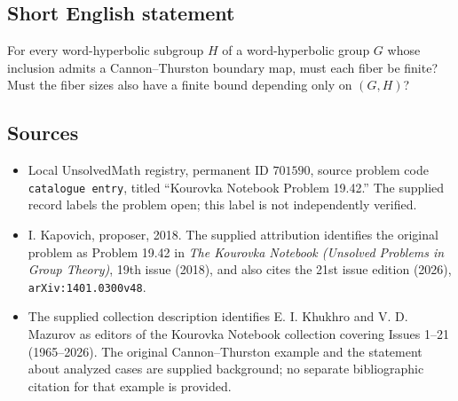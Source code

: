 \documentclass[11pt]{article}
\begin{document}
\subsection{Short English statement}
For every word-hyperbolic subgroup \(H\) of a word-hyperbolic group \(G\) whose inclusion admits a Cannon--Thurston boundary map, must each fiber be finite? Must the fiber sizes also have a finite bound depending only on \((G,H)\)?
\subsection{Sources}
\begin{itemize}
\item Local UnsolvedMath registry, permanent ID \(701590\), source problem code \texttt{catalogue entry}, titled ``Kourovka Notebook Problem 19.42.'' The supplied record labels the problem open; this label is not independently verified.
\item I. Kapovich, proposer, 2018. The supplied attribution identifies the original problem as Problem 19.42 in \emph{The Kourovka Notebook (Unsolved Problems in Group Theory)}, 19th issue (2018), and also cites the 21st issue edition (2026), \texttt{arXiv:1401.0300v48}.
\item The supplied collection description identifies E. I. Khukhro and V. D. Mazurov as editors of the Kourovka Notebook collection covering Issues 1--21 (1965--2026). The original Cannon--Thurston example and the statement about analyzed cases are supplied background; no separate bibliographic citation for that example is provided.
\end{itemize}
\end{document}
